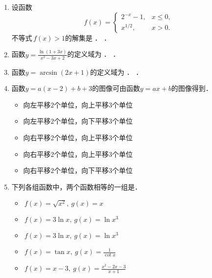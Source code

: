 \begin{enumerate}
\item 设函数
  \[
    f(x) =
    \begin{cases}
      2^{-x} - 1, & x \le 0, \\
      x^{1/2}, & x > 0.
    \end{cases}
  \]
  不等式\(\,f(x) > 1\)的解集是
  \ifshowsol
    \uline{}．
  \else
    \uline{\makebox[10em]{}}．
  \fi

\item 函数\(\displaystyle y = \frac{\ln(1+3x)}{x^2-3x+2}\)的定义域为
  \ifshowsol
    \uline{}．
  \else
    \uline{\makebox[13em]{}}．
  \fi

\item 函数\(y = \arcsin(2x+1)\)的定义域为
  \ifshowsol
    \uline{}．
  \else
    \uline{\makebox[5em]{}}．
  \fi

\item 函数\(y = a(x-2) + b + 3\)的图像可由函数\(y = ax + b\)的图像\uline{\makebox[4em]{}}得到．
  \begin{itemize}
    \renewcommand{\labelitemi}{\faCircleThin}
  \item 向左平移\(2\)个单位，向上平移\(3\)个单位
  \item 向左平移\(2\)个单位，向下平移\(3\)个单位
    \ifshowsol
    \item[\faCircle] 向右平移\(2\)个单位，向上平移\(3\)个单位
    \else
    \item 向右平移\(2\)个单位，向上平移\(3\)个单位
    \fi
  \item 向右平移\(2\)个单位，向下平移\(3\)个单位
  \end{itemize}

\item 下列各组函数中，两个函数相等的一组是\uline{\makebox[4em]{}}．
  \begin{itemize}
    \renewcommand{\labelitemi}{\faCircleThin}
  \item \(\,f(x) = \sqrt{x^2},\ g(x) = x\)
    \ifshowsol
    \item[\faCircle] \(\,f(x) = 3\ln x,\ g(x) = \ln x^3\)
    \else
    \item \(\,f(x) = 3\ln x,\ g(x) = \ln x^3\)
    \fi
  \item \(\,f(x) = \tan x,\ g(x) = \frac1{\cot x}\)
  \item \(\,f(x) = x - 3,\ g(x) = \frac{x^2-2x-3}{x+1}\)
  \end{itemize}
\end{enumerate}
\fi

